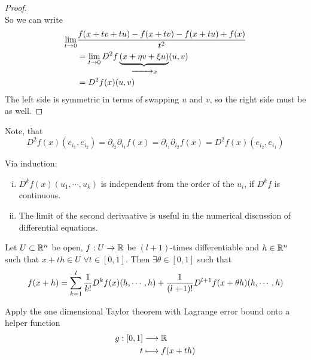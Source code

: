 \documentclass[../../script.tex]{subfiles}
\begin{document}
\begin{proof}
\begin{equation}
    \end{equation}
    So we can write
    \begin{equation}
        \begin{split}
            \limes{t}{0} &\frac{f(x + tv + tu) - f(x + tv) - f(x + tu) + f(x)}{t^2} \\
            &= \limes{t}{0} D^2 f\underbrace{(x + \eta v + \xi u)}_{\conv{} x}(u, v) \\
            &= D^2 f(x)(u, v)
        \end{split}
    \end{equation}
    The left side is symmetric in terms of swapping $u$ and $v$, so the right side must be as well.
\end{proof}

Note, that 
\[
    D^2f(x)(e_{i_1}, e_{i_2}) = \partial_{i_2} \partial_{i_1} f(x) = \partial_{i_1} \partial_{i_2} f(x) = D^2f(x)(e_{i_2}, e_{i_1})
\]

\begin{rem}
    Via induction:
    \begin{enumerate}[(i)]
        \item $D^kf(x)(u_1, \cdots, u_k)$ is independent from the order of the $u_i$, if $D^kf$ is continuous.
        \item The limit of the second derivaative is useful in the numerical discussion of differential equations.
    \end{enumerate}
\end{rem}

\begin{thm}
    Let $U \subset \realn^n$ be open, $f: U \rightarrow \realn$ be $(l + 1)$-times differentiable and $h \in \realn^n$ such that
    $x + th \in U$ $\forall t \in [0, 1]$. Then $\exists \theta \in [0, 1]$ such that 
    \[
        f(x + h) = \series[l]{k} \frac{1}{k!} D^kf(x)(h, \cdots, h) + \frac{1}{(l+1)!}D^{l+1}f(x + \theta h)(h, \cdots, h)
    \]
\end{thm}
\begin{hproof}
    Apply the one dimensional Taylor theorem with Lagrange error bound onto a helper function 
    \begin{equation}
        \begin{split}
            g: [0, 1] &\longrightarrow \realn \\
            t &\longmapsto f(x + th)
        \end{split}
    \end{equation}
\end{hproof}
\end{document}
